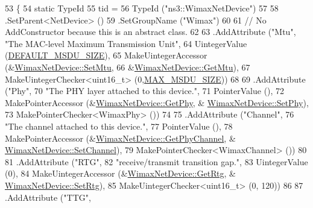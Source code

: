 \begin{DoxyCode}
53 \{
54   \textcolor{keyword}{static} TypeId
55     tid =
56     TypeId (\textcolor{stringliteral}{"ns3::WimaxNetDevice"})
57 
58     .SetParent<NetDevice> ()
59     .SetGroupName (\textcolor{stringliteral}{"Wimax"})
60 
61     \textcolor{comment}{// No AddConstructor because this is an abstract class.}
62 
63     .AddAttribute (\textcolor{stringliteral}{"Mtu"}, \textcolor{stringliteral}{"The MAC-level Maximum Transmission Unit"},
64                    UintegerValue (\hyperlink{classns3_1_1WimaxNetDevice_a44af15469163327b9d5e8aab937b6df0}{DEFAULT\_MSDU\_SIZE}),
65                    MakeUintegerAccessor (&\hyperlink{classns3_1_1WimaxNetDevice_a6ef797e785068a32f97c4f80f62a6050}{WimaxNetDevice::SetMtu},
66                                          &\hyperlink{classns3_1_1WimaxNetDevice_ad847fc199e9517a7d34f5b012bb37cca}{WimaxNetDevice::GetMtu}),
67                    MakeUintegerChecker<uint16\_t> (0,\hyperlink{classns3_1_1WimaxNetDevice_a4f1da5fb6800bef6601b6620b69ac794}{MAX\_MSDU\_SIZE}))
68 
69     .AddAttribute (\textcolor{stringliteral}{"Phy"},
70                    \textcolor{stringliteral}{"The PHY layer attached to this device."},
71                    PointerValue (),
72                    MakePointerAccessor (&\hyperlink{classns3_1_1WimaxNetDevice_a81c1f9d43acfc9cd5d642b784102a21f}{WimaxNetDevice::GetPhy}, &
      \hyperlink{classns3_1_1WimaxNetDevice_a367b1a9115fa3ba1d354cc4b6d34c283}{WimaxNetDevice::SetPhy}),
73                    MakePointerChecker<WimaxPhy> ())
74 
75     .AddAttribute (\textcolor{stringliteral}{"Channel"},
76                    \textcolor{stringliteral}{"The channel attached to this device."},
77                    PointerValue (),
78                    MakePointerAccessor (&\hyperlink{classns3_1_1WimaxNetDevice_abbd7ff170f367e0e6e980c5b0d3ab81e}{WimaxNetDevice::GetPhyChannel}, &
      \hyperlink{classns3_1_1WimaxNetDevice_a748df41d5e3c7bdacd8bd8f72754aa22}{WimaxNetDevice::SetChannel}),
79                    MakePointerChecker<WimaxChannel> ())
80 
81     .AddAttribute (\textcolor{stringliteral}{"RTG"},
82                    \textcolor{stringliteral}{"receive/transmit transition gap."},
83                    UintegerValue (0),
84                    MakeUintegerAccessor (&\hyperlink{classns3_1_1WimaxNetDevice_abd27010a030924757238ad2baef094f0}{WimaxNetDevice::GetRtg}, &
      \hyperlink{classns3_1_1WimaxNetDevice_a0fd2e927d4e58b5854bf0d78d7615eb4}{WimaxNetDevice::SetRtg}),
85                    MakeUintegerChecker<uint16\_t> (0, 120))
86 
87     .AddAttribute (\textcolor{stringliteral}{"TTG"},

\end{DoxyCode}
